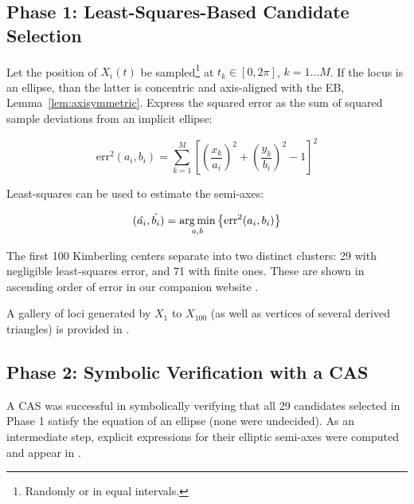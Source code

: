 \subsection{Phase 1: Least-Squares-Based Candidate Selection}

Let the position of $X_i(t)$ be sampled\footnote{Randomly or in equal intervals.} at $t_k\in[0,2\pi]$, $k=1{\ldots}M$. If the locus is an ellipse, than the latter is concentric and axis-aligned with the EB, Lemma~\ref{lem:axisymmetric}. Express the squared error as the sum of squared sample deviations from an implicit ellipse:

\begin{equation}
\text{err}^2(a_i,b_i)= \sum_{k=1}^M{\left[\left(\frac{x_k}{a_i}\right)^2+\left(\frac{y_k}{b_i}\right)^2-1\right]^2}
\label{eqn:fit-error}
\end{equation}

\noindent Least-squares can be used to estimate the semi-axes:

$$
(\hat{a_i},\hat{b_i})=\operatorname*{arg\,min}_{a,b}\left\{ \text{err}^2(a_i,b_i)\right\}
$$

The first 100 Kimberling centers separate into two distinct clusters: 29 with negligible least-squares error, and 71 with finite ones. These are shown in ascending order of error in our companion website \cite[Part II]{garcia2021-ellipses-web}.

A gallery of loci generated by $X_1$ to $X_{100}$ (as well as vertices of several derived triangles) is provided in \cite{dsr_locus_gallery_2019}.

\subsection{Phase 2: Symbolic Verification with a CAS}

A CAS was successful in symbolically verifying that all 29 candidates selected in Phase 1 satisfy the equation of an ellipse (none were undecided). As an intermediate step, explicit expressions for their elliptic semi-axes were computed and appear in \cite[Part I]{garcia2021-ellipses-web}.

